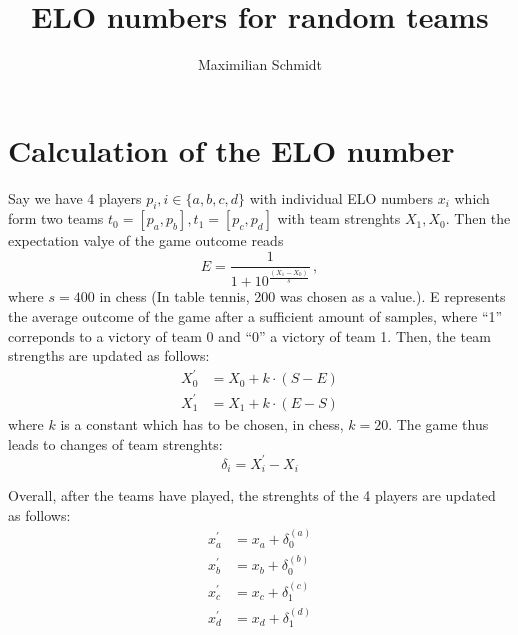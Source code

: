 \documentclass[a4paper,10pt]{article}
\title{ELO numbers for random teams}
\author{Maximilian Schmidt}
\begin{document}
\maketitle

\tableofcontents

\section{Calculation of the ELO number}
Say we have 4 players $p_i, i \in \{a,b,c,d \}$ with individual ELO numbers $x_i$ which form two teams $t_0 = [p_a, p_b], t_1 = [p_c,p_d]$ with team strenghts $X_1,X_0$.  Then the expectation valye of the game outcome reads
\begin{equation}
  E = \frac{1}{1+10^{\frac{(X_1-X_0)}{s}}}\, ,
\end{equation}
where $s=400$ in chess (In table tennis, 200 was chosen as a value.). E represents the average outcome of the game after a sufficient amount of samples, where ``1'' correponds to a victory of team 0 and ``0'' a victory of team 1.
Then, the team strengths are updated as follows:
\begin{eqnarray}
  X_0^{\prime} &= X_0 + k \cdot \left(S - E \right) \\
  X_1^{\prime} &= X_1 + k \cdot \left(E-S \right)
\label{eq:update}
\end{eqnarray}
where $k$ is a constant which has to be chosen, in chess, $k=20$. The game thus leads to changes of team strenghts:
\begin{equation}
  \delta_i = X_i^{\prime} - X_i
\end{equation}

Overall, after the teams have played, the strenghts of the 4 players are updated as follows:
\begin{eqnarray}
  x_a^{\prime} &= x_a + \delta_0^{(a)} \\
  x_b^{\prime} &= x_b + \delta_0^{(b)} \\
  x_c^{\prime} &= x_c + \delta_1^{(c)} \\
  x_d^{\prime} &= x_d + \delta_1^{(d)} 
\end{eqnarray}
\end{document}
